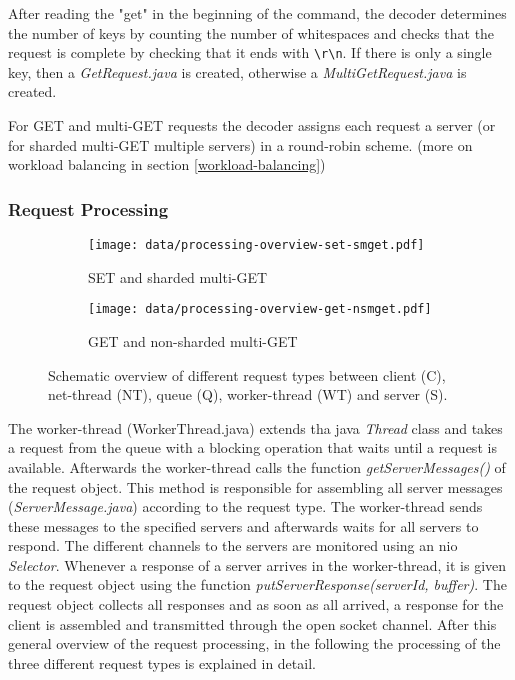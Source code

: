 \documentclass[report.tex]{subfiles}
\begin{document}
After reading the "get" in the beginning of the command, the decoder determines the number of keys by counting the number of whitespaces and checks that the request is complete by checking that it ends with \texttt{\textbackslash r\textbackslash n}. If there is only a single key, then a \emph{GetRequest.java} is created, otherwise a \emph{MultiGetRequest.java} is created.

For GET and multi-GET requests the decoder assigns each request a server (or for sharded multi-GET multiple servers) in a round-robin scheme. (more on workload balancing in section \ref{workload-balancing})


\subsubsection{Request Processing}\label{request-processing}

\begin{figure}[H]
	\begin{subfigure}[b]{.45\linewidth}
		\centering
		\texttt{[image: data/processing-overview-set-smget.pdf]}
		\caption{SET and sharded multi-GET}\label{processing-set-smget}
	\end{subfigure}\hfill
	\begin{subfigure}[b]{.45\linewidth}
		\centering
		\texttt{[image: data/processing-overview-get-nsmget.pdf]}
		\caption{GET and non-sharded multi-GET}\label{processing-get-nsmget}
	\end{subfigure}
\caption{Schematic overview of different request types between client (C), net-thread (NT), queue (Q), worker-thread (WT) and server (S).}
\end{figure}


The worker-thread (WorkerThread.java) extends tha java \emph{Thread} class and takes a request from the queue with a blocking operation that waits until a request is available.
Afterwards the worker-thread calls the function \emph{getServerMessages()} of the request object.
This method is responsible for assembling all server messages (\emph{ServerMessage.java}) according to the request type.
The worker-thread sends these messages to the specified servers and afterwards waits for all servers to respond.
The different channels to the servers are monitored using an nio \emph{Selector}. Whenever a response of a server arrives in the worker-thread, it is given to the request object using the function \emph{putServerResponse(serverId, buffer)}. The request object collects all responses and as soon as all arrived, a response for the client is assembled and transmitted through the open socket channel. After this general overview of the request processing, in the following the processing of the three different request types is explained in detail.
\end{document}
